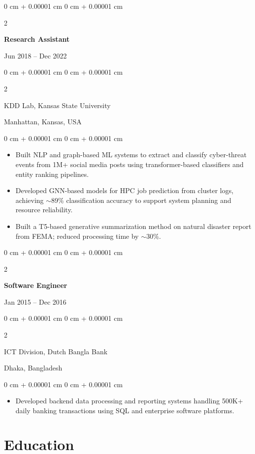 \documentclass[10pt, letterpaper]{article}
\newenvironment{highlights}{
    \begin{itemize}[
        topsep=0.10 cm,
        parsep=0.10 cm,
        partopsep=0pt,
        itemsep=0pt,
        leftmargin=0 cm + 10pt
    ]
}{
    \end{itemize}
} %
\newenvironment{onecolentry}{
    \begin{adjustwidth}{
        0 cm + 0.00001 cm
    }{
        0 cm + 0.00001 cm
    }
}{
    \end{adjustwidth}
} %
\newenvironment{twocolentry}[2][]{
    \onecolentry
    \def\secondColumn{#2}
    \setcolumnwidth{\fill, 4.5 cm}
    \begin{paracol}{2}
}{
    \switchcolumn \raggedleft \secondColumn
    \end{paracol}
    \endonecolentry
} %
\begin{document}
    \vspace{1mm}

    \begin{twocolentry}{Jun 2018 -- Dec 2022}
        \textbf{Research Assistant}
    \end{twocolentry}
    \begin{twocolentry}{Manhattan, Kansas, USA}
       KDD Lab, Kansas State University
    \end{twocolentry}
    \vspace{0.10 cm}
    \begin{onecolentry}
        \begin{highlights}
            \item Built NLP and graph-based ML systems to extract and classify cyber-threat events from 1M+ social media posts using transformer-based classifiers and entity ranking pipelines.
            \item Developed GNN-based models for HPC job prediction from cluster logs, achieving $\sim$89\% classification accuracy to support system planning and resource reliability.
            \item Built a T5-based generative summarization method on natural disaster report from FEMA; reduced processing time by $\sim$30\%.
        \end{highlights}
    \end{onecolentry}

    \vspace{0.1 cm}
    \begin{twocolentry}{Jan 2015 -- Dec 2016}
        \textbf{Software Engineer}
    \end{twocolentry}
    \begin{twocolentry}{Dhaka, Bangladesh}
       ICT Division, Dutch Bangla Bank
    \end{twocolentry}

    \begin{onecolentry}
        \begin{highlights}
            \item Developed backend data processing and reporting systems handling 500K+ daily banking transactions using SQL and enterprise software platforms.
        \end{highlights}
    \end{onecolentry}

\section{Education}
\end{document}
